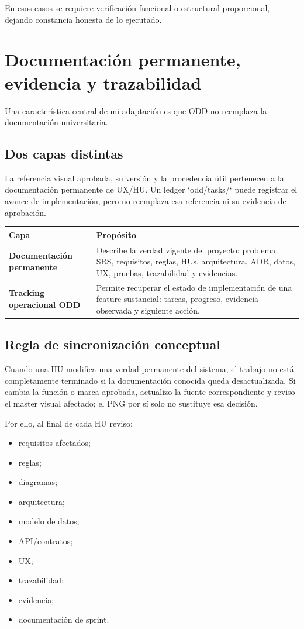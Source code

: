 \documentclass[11pt,a4paper]{article}
\begin{document}
En esos casos se requiere verificación funcional o estructural proporcional, dejando constancia honesta de lo ejecutado.

\section{Documentación permanente, evidencia y trazabilidad}

Una característica central de mi adaptación es que ODD no reemplaza la documentación universitaria.

\subsection{Dos capas distintas}

La referencia visual aprobada, su versión y la procedencia útil pertenecen a la documentación permanente de UX/HU. Un ledger `odd/tasks/` puede registrar el avance de implementación, pero no reemplaza esa referencia ni su evidencia de aprobación.

\begin{tabularx}{\textwidth}{>{\bfseries}p{}X}
\toprule
Capa & Propósito \\
\midrule
Documentación permanente &
Describe la verdad vigente del proyecto: problema, SRS, requisitos, reglas, HUs, arquitectura, ADR, datos, UX, pruebas, trazabilidad y evidencias. \\
Tracking operacional ODD &
Permite recuperar el estado de implementación de una feature sustancial: tareas, progreso, evidencia observada y siguiente acción. \\
\bottomrule
\end{tabularx}

\subsection{Regla de sincronización conceptual}

Cuando una HU modifica una verdad permanente del sistema, el trabajo no está completamente terminado si la documentación conocida queda desactualizada. Si cambia la función o marca aprobada, actualizo la fuente correspondiente y reviso el master visual afectado; el PNG por sí solo no sustituye esa decisión.

Por ello, al final de cada HU reviso:

\begin{itemize}
    \item requisitos afectados;
    \item reglas;
    \item diagramas;
    \item arquitectura;
    \item modelo de datos;
    \item API/contratos;
    \item UX;
    \item trazabilidad;
    \item evidencia;
    \item documentación de sprint.
\end{itemize}
\end{document}
